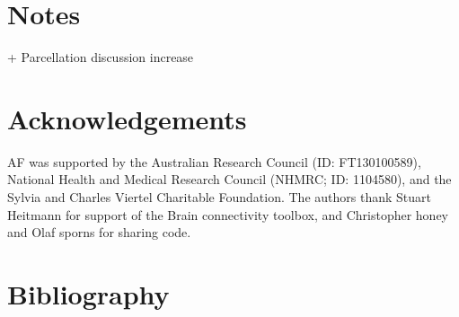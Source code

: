 \documentclass[oneside]{zHenriquesLab-StyleBioRxiv}
\begin{document}
\section*{Notes}
+ Parcellation discussion increase

\section*{Acknowledgements}


\begin{acknowledgements}
AF was supported by the Australian Research Council (ID: FT130100589), National Health and Medical Research Council (NHMRC; ID: 1104580), and the Sylvia and Charles Viertel Charitable Foundation. The authors thank Stuart Heitmann for support of the Brain connectivity toolbox, and Christopher honey and Olaf sporns for sharing code. 
\end{acknowledgements}

\section*{Bibliography}



\onecolumn
\newpage






\end{document}
